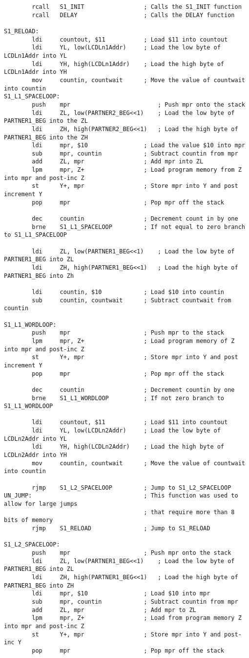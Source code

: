 \documentclass[12pt, letterpaper]{article}
\begin{document}
\begin{verbatim}
		rcall	S1_INIT					; Calls the S1_INIT function
		rcall	DELAY					; Calls the DELAY function

S1_RELOAD:
		ldi		countout, $11			; Load $11 into countout
		ldi		YL, low(LCDLn1Addr)		; Load the low byte of LCDLn1Addr into YL
		ldi		YH, high(LCDLn1Addr)	; Load the high byte of LCDLn1Addr into YH
		mov		countin, countwait		; Move the value of countwait into countin
S1_L1_SPACELOOP:
		push	mpr							; Push mpr onto the stack
		ldi		ZL, low(PARTNER2_BEG<<1)	; Load the low byte of PARTNER1_BEG into the ZL
		ldi		ZH, high(PARTNER2_BEG<<1)	; Load the high byte of PARTNER1_BEG into the ZH
		ldi		mpr, $10				; Load the value $10 into mpr
		sub		mpr, countin			; Subtract countin from mpr
		add		ZL,	mpr					; Add mpr into ZL
		lpm		mpr, Z+					; Load program memory from Z into mpr and post-inc Z
		st		Y+, mpr					; Store mpr into Y and post increment Y
		pop		mpr						; Pop mpr off the stack

		dec		countin					; Decrement count in by one
		brne	S1_L1_SPACELOOP			; If not equal to zero branch to S1_L1_SPACELOOP
		
		ldi		ZL, low(PARTNER1_BEG<<1)	; Load the low byte of PARTNER1_BEG into ZL
		ldi		ZH, high(PARTNER1_BEG<<1)	; Load the high byte of PARTNER1_BEG into Zh

		ldi		countin, $10			; Load $10 into countin
		sub		countin, countwait		; Subtract countwait from countin

S1_L1_WORDLOOP:
		push	mpr						; Push mpr to the stack
		lpm		mpr, Z+					; Load program memory of Z into mpr and post-inc Z
		st		Y+, mpr					; Store mpr into Y and post increment Y
		pop		mpr						; Pop mpr off the stack
						
		dec		countin					; Decrement countin by one
		brne	S1_L1_WORDLOOP			; If not zero branch to S1_L1_WORDLOOP

		ldi		countout, $11			; Load $11 into countout
		ldi		YL, low(LCDLn2Addr)		; Load the low byte of LCDLn2Addr into YL
		ldi		YH, high(LCDLn2Addr)	; Load the high byte of LCDLn2Addr into YH
		mov		countin, countwait		; Move the value of countwait into countin

		rjmp	S1_L2_SPACELOOP			; Jump to S1_L2_SPACELOOP
UN_JUMP:								; This function was used to allow for large jumps 
										; that require more than 8 bits of memory
		rjmp	S1_RELOAD				; Jump to S1_RELOAD

S1_L2_SPACELOOP:
		push	mpr						; Push mpr onto the stack
		ldi		ZL, low(PARTNER1_BEG<<1)	; Load the low byte of PARTNER1_BEG into ZL
		ldi		ZH, high(PARTNER1_BEG<<1)	; Load the high byte of PARTNER1_BEG into ZH
		ldi		mpr, $10				; Load $10 into mpr
		sub		mpr, countin			; Subtract countin from mpr
		add		ZL,	mpr					; Add mpr to ZL
		lpm		mpr, Z+					; Load from program memory Z into mpr and post-inc Z
		st		Y+, mpr					; Store mpr into Y and post-inc Y
		pop		mpr						; Pop mpr off the stack


\end{verbatim}
\end{document}
